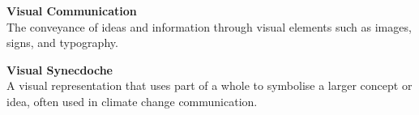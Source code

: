 \vspace{4mm}

\noindent \textbf{Visual Communication}\\
\noindent The conveyance of ideas and information through visual elements such as images, signs, and typography.

\vspace{4mm}

\noindent \textbf{Visual Synecdoche}\\
\noindent A visual representation that uses part of a whole to symbolise a larger concept or idea, often used in climate change communication.
